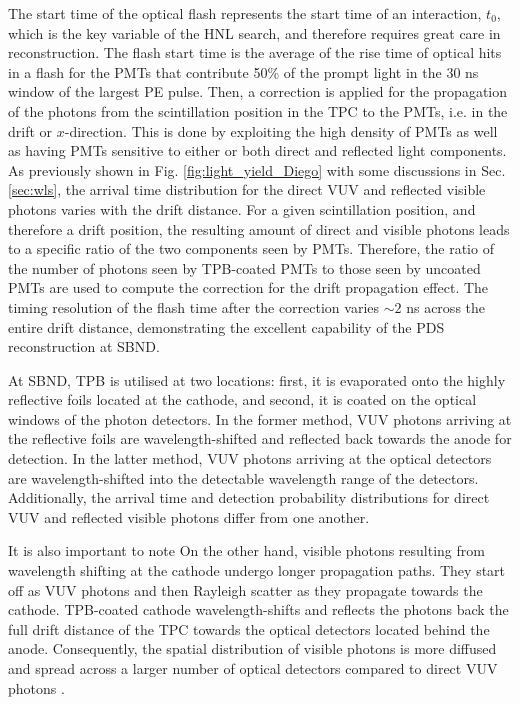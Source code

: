 The start time of the optical flash represents the start time of an interaction, $t_0$, which is the key
 variable of the HNL search, and therefore requires great care in reconstruction.
The flash start time is the average of the rise time of optical hits in a flash for the PMTs that contribute 50\% of the prompt light in the 30 ns window of the largest PE pulse.                              
Then, a correction is applied for the propagation of the photons from the scintillation position in the TPC to the PMTs, i.e. in the drift or $x$-direction.                                                    
This is done by exploiting the high density of PMTs as well as having PMTs sensitive to either or both 
direct and reflected light components.
As previously shown in Fig. \ref{fig:light_yield_Diego} with some discussions in Sec. \ref{sec:wls}, the
 arrival time distribution for the direct VUV and reflected visible photons varies with the drift distance.
For a given scintillation position, and therefore a drift position, the resulting amount of direct and visible photons leads to a specific ratio of the two components seen by PMTs.                     
Therefore, the ratio of the number of photons seen by TPB-coated PMTs to those seen by uncoated 
PMTs are used to compute the correction for the drift propagation effect.
The timing resolution of the flash time after the correction varies $\sim 2$ ns across the entire drift distance, demonstrating the excellent capability of the PDS reconstruction at SBND.

At SBND, TPB is utilised at two locations: first, it is evaporated onto the highly reflective foils located at the cathode, and second, it is coated on the optical windows of the photon detectors. 
In the former method, VUV photons arriving at the reflective foils are wavelength-shifted and reflected back towards the anode for detection.
In the latter method,  VUV photons arriving at the optical detectors are wavelength-shifted into the detectable wavelength range of the detectors.
Additionally, the arrival time and detection probability distributions for direct VUV and reflected visible photons differ from one another.

It is also important to note 
On the other hand, visible photons resulting from wavelength shifting at the cathode undergo longer propagation paths.
They start off as VUV photons and then Rayleigh scatter as they propagate towards the cathode.
TPB-coated cathode wavelength-shifts and reflects the photons back the full drift distance of the TPC towards the optical detectors located behind the anode.
Consequently, the spatial distribution of visible photons is more diffused and spread across a larger number of optical detectors compared to direct VUV photons \cite{PatrickPhD}.

